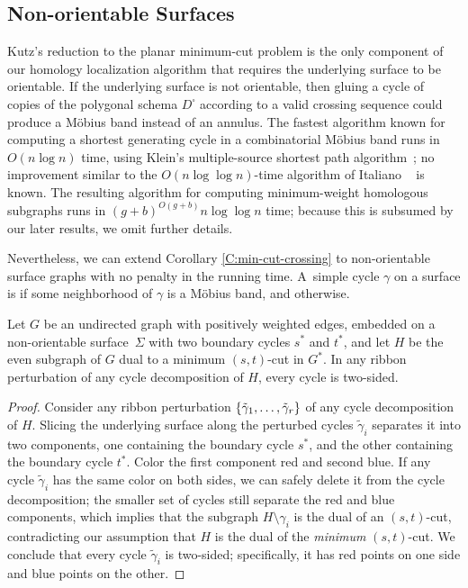 \documentclass[letterpaper,review]{siamart190516}
\begin{document}
\subsection{Non-orientable Surfaces}
\label{sec:nononono}

Kutz's reduction to the planar minimum-cut problem is the only component of our homology localization algorithm that requires the underlying surface to be orientable.  If the underlying surface is not orientable, then gluing a cycle of copies of the polygonal schema $D^\square$ according to a valid crossing sequence could produce a Möbius band instead of an annulus.  The fastest algorithm known for computing a shortest generating cycle in a combinatorial Möbius band runs in $O(n\log n)$ time, using Klein's multiple-source shortest path algorithm~\cite{k-msspp-05}; no improvement similar to the $O(n\log\log n)$-time algorithm of Italiano \etal~\cite{insw-iamcmf-11} is known.  The resulting algorithm for computing minimum-weight homologous subgraphs runs in $(g+b)^{O(g+b)} n\log \log n$ time; because this is subsumed by our later results, we omit further details.

Nevertheless, we can extend Corollary \ref{C:min-cut-crossing} to non-orientable surface graphs with no penalty in the running time.  A~simple cycle $\gamma$ on a surface is  if some neighborhood of $\gamma$ is a Möbius band, and  otherwise.

\begin{lemma}
Let $G$ be an undirected graph with positively weighted edges, embedded on a non-orientable surface~$\Sigma$ with two boundary cycles $s^*$ and $t^*$, and let $H$ be the even subgraph of $G$ dual to a minimum $(s,t)$-cut in $G^*$.  In any ribbon perturbation of any cycle decomposition of $H$, every cycle is two-sided.
\end{lemma}

\begin{proof}
Consider any ribbon perturbation $\{ \tilde\gamma_1, \dots, \tilde\gamma_r \}$ of any cycle decomposition of $H$.  Slicing the underlying surface along the perturbed cycles $\tilde\gamma_i$ separates it into two components, one containing the boundary cycle $s^*$, and the other containing the boundary cycle $t^*$.  Color the first component red and second blue.  If any cycle $\tilde\gamma_i$ has the same color on both sides, we can safely delete it from the cycle decomposition; the smaller set of cycles still separate the red and blue components, which implies that the subgraph $H\setminus \gamma_i$ is the dual of an $(s,t)$-cut, contradicting our assumption that $H$ is the dual of the \emph{minimum} $(s,t)$-cut.  We conclude that every cycle $\tilde\gamma_i$ is two-sided; specifically, it has red points on one side and blue points on the other.
\end{proof}
\end{document}
